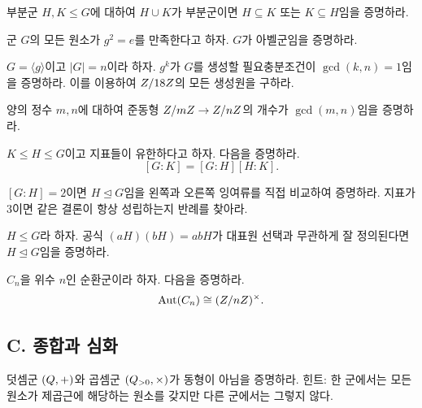\begin{exercise}
부분군 $H,K\le G$에 대하여 $H\cup K$가 부분군이면 $H\subseteq K$ 또는 $K\subseteq H$임을 증명하라.
\end{exercise}

\begin{exercise}
군 $G$의 모든 원소가 $g^2=e$를 만족한다고 하자. $G$가 아벨군임을 증명하라.
\end{exercise}

\begin{exercise}
$G=\langle g\rangle$이고 $|G|=n$이라 하자. $g^k$가 $G$를 생성할 필요충분조건이 $\gcd(k,n)=1$임을 증명하라. 이를 이용하여 $Z/18Z$의 모든 생성원을 구하라.
\end{exercise}

\begin{exercise}
양의 정수 $m,n$에 대하여 준동형 $Z/mZ\to Z/nZ$의 개수가 $\gcd(m,n)$임을 증명하라.
\end{exercise}

\begin{exercise}
$K\le H\le G$이고 지표들이 유한하다고 하자. 다음을 증명하라.
\[
  [G:K]=[G:H][H:K].
\]
\end{exercise}

\begin{exercise}
$[G:H]=2$이면 $H\trianglelefteq G$임을 왼쪽과 오른쪽 잉여류를 직접 비교하여 증명하라. 지표가 $3$이면 같은 결론이 항상 성립하는지 반례를 찾아라.
\end{exercise}

\begin{exercise}
$H\le G$라 하자. 공식 $(aH)(bH)=abH$가 대표원 선택과 무관하게 잘 정의된다면 $H\trianglelefteq G$임을 증명하라.
\end{exercise}

\begin{exercise}
$C_n$을 위수 $n$인 순환군이라 하자. 다음을 증명하라.
\[
  \operatorname{Aut}(C_n)\cong(Z/nZ)^\times.
\]
\end{exercise}

\subsection*{C. 종합과 심화}

\begin{exercise}[$\Q$의 두 군]
덧셈군 $(Q,+)$와 곱셈군 $(Q_{>0},\times)$가 동형이 아님을 증명하라. 힌트: 한 군에서는 모든 원소가 제곱근에 해당하는 원소를 갖지만 다른 군에서는 그렇지 않다.
\end{exercise}

